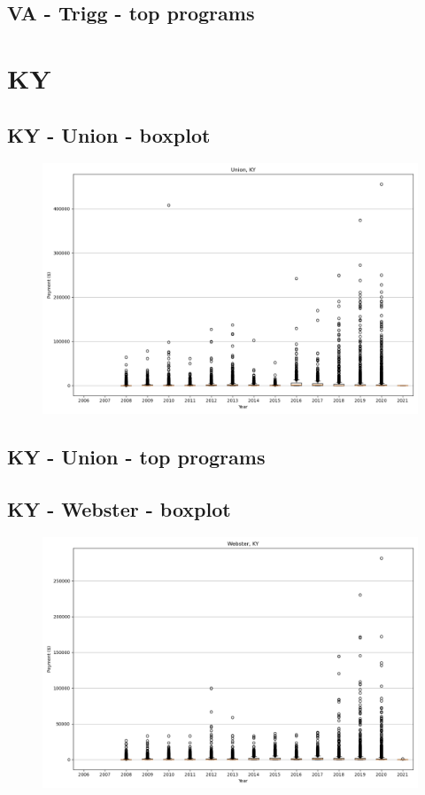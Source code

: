 \subsection*{VA - Trigg - top programs}

\newpage
\section*{KY}
\subsection*{KY - Union - boxplot}
\begin{figure}[h]
\centering
\includegraphics[width=7in]{../output/boxplots/counties/Union-KY_boxplot.png}
\end{figure}


\subsection*{KY - Union - top programs}

\newpage
\subsection*{KY - Webster - boxplot}
\begin{figure}[h]
\centering
\includegraphics[width=7in]{../output/boxplots/counties/Webster-KY_boxplot.png}
\end{figure}



